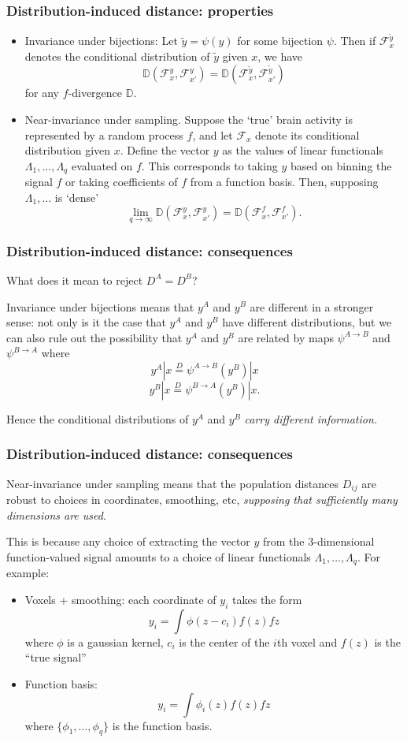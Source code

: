 \documentclass{beamer}
\begin{document}
\begin{frame}
\frametitle{Distribution-induced distance: properties}
\begin{itemize}
\item Invariance under bijections: Let $\tilde{y} = \psi(y)$ for some
  bijection $\psi$.  Then if $\mathcal{F}_x^{\tilde{y}}$ denotes the
  conditional distribution of $\tilde{y}$ given $x$, we have
\[
\mathbb{D}(\mathcal{F}_x^y, \mathcal{F}_{x'}^y) = \mathbb{D}(\mathcal{F}_x^{\tilde{y}}, \mathcal{F}_{x'}^{\tilde{y}})
\]
for any $f$-divergence $\mathbb{D}$.
\item Near-invariance under sampling.  Suppose the `true' brain
  activity is represented by a random process $f$, and let
  $\mathcal{F}_x$ denote its conditional distribution given $x$.
  Define the vector $y$ as the values of linear functionals
  $\Lambda_1,\hdots, \Lambda_q$ evaluated on $f$.  This corresponds to
  taking $y$ based on binning the signal $f$ or taking coefficients of
  $f$ from a function basis.  Then, supposing $\Lambda_1,\hdots$ is
  `dense'
\[
\lim_{q \to \infty} \mathbb{D}(\mathcal{F}_x^y, \mathcal{F}_{x'}^y) = \mathbb{D}(\mathcal{F}_x^f, \mathcal{F}_{x'}^f).
\]
\end{itemize}
\end{frame}

\begin{frame}
\frametitle{Distribution-induced distance: consequences}
What does it mean to reject $D^A = D^B$?

Invariance under bijections means that $y^A$ and $y^B$ are different
in a stronger sense: not only is it the case that $y^A$ and $y^B$ have
different distributions, but we can also rule out the possibility that
$y^A$ and $y^B$ are related by maps $\psi^{A\to B}$ and $\psi^{B \to
  A}$ where
\[
y^A|x \stackrel{D}{=} \psi^{A\to B}(y^B)|x
\]
\[
y^B|x \stackrel{D}{=} \psi^{B\to A}(y^B)|x.
\]

Hence the conditional distributions of $y^A$ and $y^B$ \emph{carry different information.}
\end{frame}

\begin{frame}
\frametitle{Distribution-induced distance: consequences}
Near-invariance under sampling means that the population distances
$D_{ij}$ are robust to choices in coordinates, smoothing, etc,
\emph{supposing that sufficiently many dimensions are used}.

This is because any choice of extracting the vector $y$ from the 3-dimensional function-valued signal
amounts to a choice of linear functionals $\Lambda_1,\hdots, \Lambda_q$.  For example:
\begin{itemize}
\item Voxels + smoothing: each coordinate of $y_i$ takes the form
\[
y_i = \int \phi(z - c_i) f(z) fz
\]
where $\phi$ is a gaussian kernel, $c_i$ is the center of the $i$th voxel and $f(z)$ is the ``true signal''
\item Function basis:
\[
y_i = \int \phi_i(z) f(z) fz
\]
where $\{\phi_1,\hdots, \phi_q\}$ is the function basis.
\end{itemize}
\end{frame}
\end{document}
